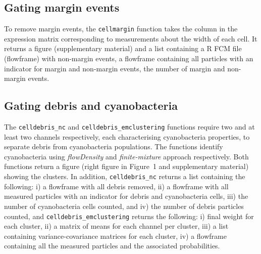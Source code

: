 \documentclass[a4paper,12pt]{extarticle}
\begin{document}
\subsection{Gating margin events}
To remove margin events, the \texttt{cellmargin} function takes the column in the expression matrix corresponding to measurements about the width of each cell. It returns a figure (supplementary material) and a list containing a R FCM file (flowframe) with non-margin events, a flowframe containing all particles with an indicator for margin and non-margin events, the number of margin and non-margin events.

\subsection{Gating debris and cyanobacteria}
 The \texttt{celldebris\_nc} and \texttt{celldebris\_emclustering} functions require two and at least two channels respectively, each characterising cyanobacteria properties, to separate debris from cyanobacteria populations. The functions identify cyanobacteria using \emph{flowDensity} \citep{Malek:2015a} and \emph{finite-mixture} approach \citep{Lo:2009} respectively. Both functions return a figure (right figure in Figure~1\vphantom{\ref{fig:1}} and supplementary material) showing the clusters. In addition, \texttt{celldebris\_nc} returns a list containing the following: i) a flowframe with all debris removed, ii) a flowframe with all measured particles with an indicator for debris and cyanobacteria cells, iii) the number of cyanobacteria cells counted, and iv) the number of debris particles counted, and \texttt{celldebris\_emclustering} returns the following: i) final weight for each cluster, ii) a matrix of means for each channel per cluster, iii) a list containing variance-covariance matrices for each cluster, iv) a flowframe containing all the measured particles and the associated probabilities.
%	
\end{document}
